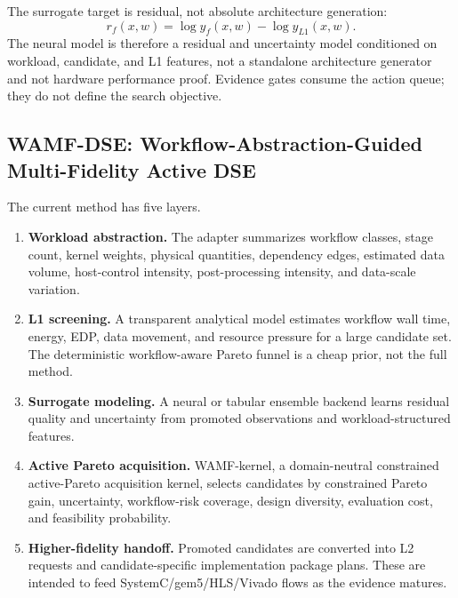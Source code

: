 \documentclass[sigconf,anonymous,review]{acmart}
\begin{document}
The surrogate target is residual, not absolute architecture generation:
\[
r_f(x,w)=\log y_f(x,w)-\log y_{L1}(x,w).
\]
The neural model is therefore a residual and uncertainty model conditioned on workload, candidate, and L1 features, not a standalone architecture generator and not hardware performance proof.  Evidence gates consume the action queue; they do not define the search objective.

\subsection{WAMF-DSE: Workflow-Abstraction-Guided Multi-Fidelity Active DSE}

The current method has five layers.

\begin{enumerate}
  \item \textbf{Workload abstraction.}  The adapter summarizes workflow classes, stage count, kernel weights, physical quantities, dependency edges, estimated data volume, host-control intensity, post-processing intensity, and data-scale variation.
  \item \textbf{L1 screening.}  A transparent analytical model estimates workflow wall time, energy, EDP, data movement, and resource pressure for a large candidate set.  The deterministic workflow-aware Pareto funnel is a cheap prior, not the full method.
  \item \textbf{Surrogate modeling.}  A neural or tabular ensemble backend learns residual quality and uncertainty from promoted observations and workload-structured features.
  \item \textbf{Active Pareto acquisition.}  WAMF-kernel, a domain-neutral constrained active-Pareto acquisition kernel, selects candidates by constrained Pareto gain, uncertainty, workflow-risk coverage, design diversity, evaluation cost, and feasibility probability.
  \item \textbf{Higher-fidelity handoff.}  Promoted candidates are converted into L2 requests and candidate-specific implementation package plans.  These are intended to feed SystemC/gem5/HLS/Vivado flows as the evidence matures.
\end{enumerate}
\end{document}
